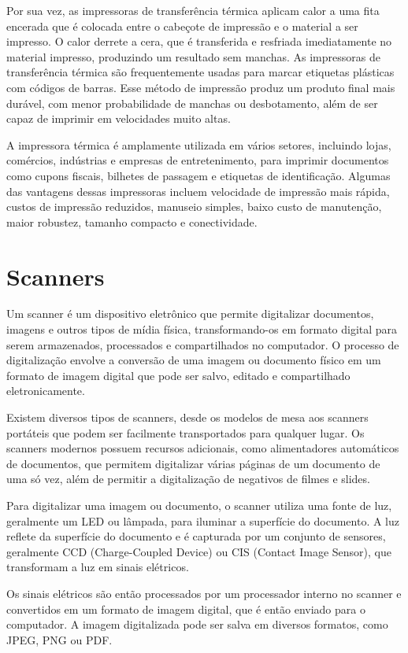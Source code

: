 \documentclass[12pt,a4, oneside, brazil]{article}
\begin{document}
			Por sua vez, as impressoras de transferência térmica aplicam calor a uma fita encerada que é colocada entre o cabeçote de impressão e o material a ser impresso. O calor derrete a cera, que é transferida e resfriada imediatamente no material impresso, produzindo um resultado sem manchas.
			As impressoras de transferência térmica são frequentemente usadas para marcar etiquetas plásticas com códigos de barras. Esse método de impressão produz um produto final mais durável, com menor probabilidade de manchas ou desbotamento, além de ser capaz de imprimir em velocidades muito altas.
			
			A impressora térmica é amplamente utilizada em vários setores, incluindo lojas, comércios, indústrias e empresas de entretenimento, para imprimir documentos como cupons fiscais, bilhetes de passagem e etiquetas de identificação. Algumas das vantagens dessas impressoras incluem velocidade de impressão mais rápida, custos de impressão reduzidos, manuseio simples, baixo custo de manutenção, maior robustez, tamanho compacto e conectividade.

	\section{Scanners}

	Um scanner é um dispositivo eletrônico que permite digitalizar documentos, imagens e outros tipos de mídia física, transformando-os em formato digital para serem armazenados, processados e compartilhados no computador. O processo de digitalização envolve a conversão de uma imagem ou documento físico em um formato de imagem digital que pode ser salvo, editado e compartilhado eletronicamente.
	
	Existem diversos tipos de scanners, desde os modelos de mesa aos scanners portáteis que podem ser facilmente transportados para qualquer lugar. Os scanners modernos possuem recursos adicionais, como alimentadores automáticos de documentos, que permitem digitalizar várias páginas de um documento de uma só vez, além de permitir a digitalização de negativos de filmes e slides.
	
	Para digitalizar uma imagem ou documento, o scanner utiliza uma fonte de luz, geralmente um LED ou lâmpada, para iluminar a superfície do documento. A luz reflete da superfície do documento e é capturada por um conjunto de sensores, geralmente CCD (Charge-Coupled Device) ou CIS (Contact Image Sensor), que transformam a luz em sinais elétricos.
	
	Os sinais elétricos são então processados por um processador interno no scanner e convertidos em um formato de imagem digital, que é então enviado para o computador. A imagem digitalizada pode ser salva em diversos formatos, como JPEG, PNG ou PDF.
	
\end{document}
